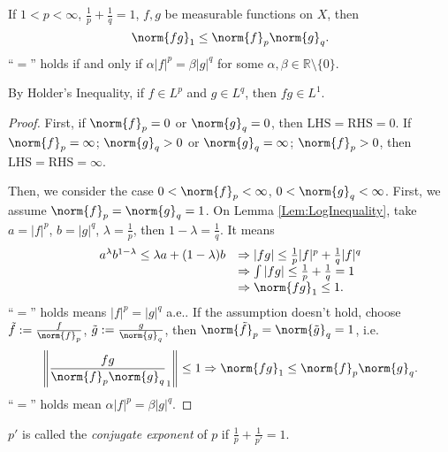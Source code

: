 \begin{thm}
    \label{Thm:Holder}
    If $1<p<\infty$, $\frac{1}{p}+\frac{1}{q}=1$, 
    $f,g$ be measurable functions on $X$, then 
    \begin{equation}
        \label{Equ:HolderInequality}
        \norm{fg}_{1}\le\norm{f}_{p}\norm{g}_{q}.
    \end{equation}
    ``$=$'' holds if and only if $\alpha|f|^{p}=\beta|g|^{q}$ 
    for some $\alpha,\beta\in\mathbb{R}\setminus\{0\}$.
\end{thm}
\begin{rem}
    By Holder's Inequality, if $f\in L^{p}$ and $g\in L^{q}$, 
    then $fg\in L^{1}$.
\end{rem}
\begin{proof}
    First, if $\norm{f}_{p}=0$ or $\norm{g}_{q}=0$, 
    then $\text{LHS}=\text{RHS}=0$. If $\norm{f}_{p}=\infty$; 
    $\norm{g}_{q}>0$ 
    or $\norm{g}_{q}=\infty$; $\norm{f}_{p}>0$, then 
    $\text{LHS}=\text{RHS}=\infty$.

    Then, we consider the case $0<\norm{f}_{p}<\infty$, 
    $0<\norm{g}_{q}<\infty$. First, we assume 
    $\norm{f}_{p}=\norm{g}_{q}=1$. On Lemma 
    \ref{Lem:LogInequality}, take 
    $a=|f|^{p}$, $b=|g|^{q}$, $\lambda=\frac{1}{p}$, then 
    $1-\lambda=\frac{1}{q}$. It means 
    \begin{displaymath}
        \begin{array}{rl}
            a^{\lambda}b^{1-\lambda}\le\lambda a+(1-\lambda)b&
            \Rightarrow |fg|\le\frac{1}{p}|f|^{p}+\frac{1}{q}|f|^{q}\\
            &\Rightarrow\int|fg|\le\frac{1}{p}+\frac{1}{q}=1\\
            &\Rightarrow\norm{fg}_{1}\le 1.
        \end{array}
    \end{displaymath}
    ``$=$'' holds means $|f|^{p}=|g|^{q}$ a.e.. 
    If the assumption doesn't hold, choose 
    $\tilde{f}:=\frac{f}{\norm{f}_{p}}$, 
    $\tilde{g}:=\frac{g}{\norm{g}_{q}}$, 
    then $\norm{\tilde{f}}_{p}=\norm{\tilde{g}}_{q}=1$, i.e. 
    \begin{displaymath}
        \left\|{\frac{fg}{\norm{f}_p\norm{g}_{q}}}_{1}\right\|
        \le 1
        \Rightarrow\norm{fg}_{1}\le\norm{f}_{p}\norm{g}_{q}.
    \end{displaymath}
    ``$=$'' holds mean $\alpha|f|^{p}=\beta|g|^{q}$.
\end{proof}
\begin{ntn}
    $p'$ is called the \textit{conjugate exponent} of $p$ if 
    $\frac{1}{p}+\frac{1}{p'}=1$. 
\end{ntn}
